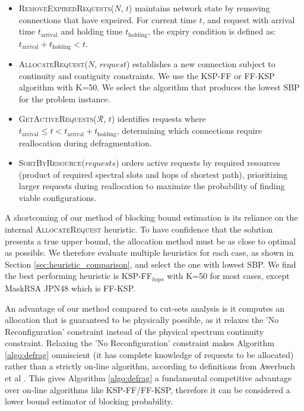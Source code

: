 \begin{itemize}
    \item \textsc{RemoveExpiredRequests}($N$, $t$) maintains network state by removing connections that have expeired. For current time $t$, and request with arrival time $t_{\text{arrival}}$ and holding time $t_{\text{holding}}$, the expiry condition is defined as: $t_{\text{arrival}} + t_{\text{holding}} < t$.
    
    \item \textsc{AllocateRequest}($N$, $request$) establishes a new connection subject to continuity and contiguity constraints. We use the KSP-FF or FF-KSP algorithm with K=50. We select the algorithm that produces the lowest SBP for the problem instance.
    
    \item \textsc{GetActiveRequests}($\mathcal{R}$, $t$) identifies requests where $t_{\text{arrival}} \leq t < t_{\text{arrival}} + t_{\text{holding}}$, determining which connections require reallocation during defragmentation.
    
    \item \textsc{SortByResource}($requests$) orders active requests by required resources (product of required spectral slots and hops of shortest path), prioritizing larger requests during reallocation to maximize the probability of finding viable configurations.
    
\end{itemize}

A shortcoming of our method of blocking bound estimation is its reliance on the internal \textsc{AllocateRequest} heuristic. To have confidence that the solution presents a true upper bound, the allocation method must be as close to optimal as possible. We therefore evaluate multiple heuristics for each case, as shown in Section \ref{sec:heuristic_comparison}, and select the one with lowest SBP. We find the best performing heuristic is KSP-FF$_{hops}$ with K=50 for most cases, except MaskRSA JPN48 which is FF-KSP.


An advantage of our method compared to cut-sets analysis is it computes an allocation that is guaranteed to be physically possible, as it relaxes the 'No Reconfiguration' constraint instead of the physical spectrum continuity constraint. Relaxing the 'No Reconfiguration' constraint makes Algorithm \ref{algo:defrag} omniscient (it has complete knowledge of requests to be allocated) rather than a strictly on-line algorithm, according to definitions from Awerbuch et al \cite{awerbuch_throughput-competitive_1993}. This gives Algorithm \ref{algo:defrag} a fundamental competitive advantage over on-line algorithms like KSP-FF/FF-KSP, therefore it can be considered a lower bound estimator of blocking probability. %

